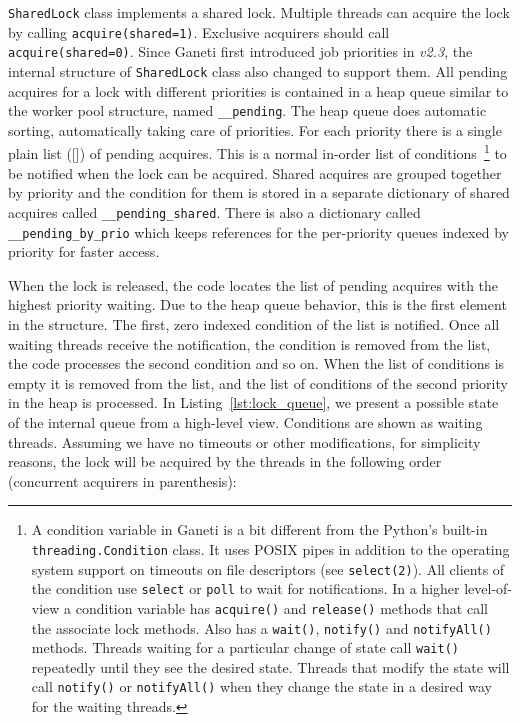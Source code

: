 \begin{description}
    \texttt{SharedLock} class implements a shared lock. Multiple threads can
    acquire the lock by calling \texttt{acquire(shared=1)}. Exclusive acquirers
    should call \texttt{acquire(shared=0)}. Since Ganeti first introduced job
    priorities in \emph{v2.3}, the internal structure of \texttt{SharedLock}
    class also changed to support them. All pending acquires for a lock with
    different priorities is contained in a heap queue similar to the worker pool
    structure, named \texttt{\_\_pending}. The heap queue does automatic sorting,
    automatically taking care of priorities. For each priority there is a single
    plain list ([]) of pending acquires. This is a normal in-order list of
    conditions~\footnote{A condition variable in Ganeti is a bit different from
    the Python's built-in \texttt{threading.Condition} class. It uses POSIX pipes
    in addition to the operating system support on timeouts on file descriptors
    (see \texttt{select(2)}). All clients of the condition use \texttt{select} or
    \texttt{poll} to wait for notifications. In a higher level-of-view a condition
    variable has \texttt{acquire()} and \texttt{release()} methods that call the
    associate lock methods. Also has a \texttt{wait()}, \texttt{notify()} and
    \texttt{notifyAll()} methods. Threads waiting for a particular change of state
    call \texttt{wait()} repeatedly until they see the desired state. Threads that
    modify the state will call \texttt{notify()} or \texttt{notifyAll()} when they
    change the state in a desired way for the waiting threads.} to be notified
    when the lock can be acquired. Shared acquires are grouped together by
    priority and the condition for them is stored in a separate dictionary
    of shared acquires called \texttt{\_\_pending\_shared}. There is also a
    dictionary called \texttt{\_\_pending\_by\_prio} which keeps references for
    the per-priority queues indexed by priority for faster access.

    When the lock is released, the code locates the list of pending acquires
    with the highest priority waiting. Due to the heap queue behavior, this is
    the first element in the structure. The first, zero indexed condition of the
    list is notified. Once all waiting threads receive the
    notification, the condition is removed from the list, the code processes the
    second condition and so on. When the list of conditions is empty it is
    removed from the list, and the list of conditions of the second priority in
    the heap is processed. In
    Listing~\ref{lst:lock_queue}, we present a possible state of the internal
    queue from a high-level view. Conditions are shown as waiting threads.
    Assuming we have no timeouts or other modifications, for simplicity reasons,
    the lock will be acquired by the threads in the following order (concurrent
    acquirers in parenthesis):


\end{description}
